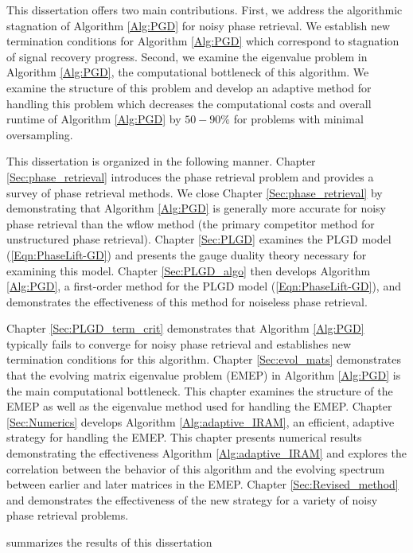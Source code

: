 This dissertation offers two main contributions.  First, we address the algorithmic stagnation of Algorithm \ref{Alg:PGD} for noisy phase retrieval.   We establish new termination conditions for Algorithm \ref{Alg:PGD} which correspond to stagnation of signal recovery progress.  Second, we examine the eigenvalue problem in Algorithm \ref{Alg:PGD}, the computational bottleneck of this algorithm.  We examine the structure of this problem and develop an adaptive method for handling this problem which decreases the computational costs and overall runtime of Algorithm \ref{Alg:PGD} by $50-90\%$ for problems with minimal oversampling.


This dissertation is organized in the following manner.  Chapter \ref{Sec:phase_retrieval} introduces the phase retrieval problem and provides a survey of phase retrieval methods.  
We close Chapter \ref{Sec:phase_retrieval} by demonstrating that Algorithm \ref{Alg:PGD} is generally more accurate for noisy phase retrieval than the wflow method (the primary competitor method for unstructured phase retrieval).
Chapter \ref{Sec:PLGD} examines the PLGD model (\ref{Eqn:PhaseLift-GD}) and presents the gauge duality theory necessary for examining this model.  Chapter \ref{Sec:PLGD_algo} then develops Algorithm \ref{Alg:PGD}, a first-order method for the PLGD model (\ref{Eqn:PhaseLift-GD}), and demonstrates the effectiveness of this method for noiseless phase retrieval.

Chapter \ref{Sec:PLGD_term_crit} demonstrates that Algorithm \ref{Alg:PGD} typically fails to converge for noisy phase retrieval and establishes new termination conditions for this algorithm.  
Chapter \ref{Sec:evol_mats}  demonstrates that the evolving matrix eigenvalue problem (EMEP) in Algorithm \ref{Alg:PGD} is the main computational bottleneck.  
This chapter examines the structure of the EMEP as well as the eigenvalue method used for handling the EMEP.  
Chapter \ref{Sec:Numerics} develops Algorithm \ref{Alg:adaptive_IRAM}, an efficient, adaptive strategy for handling the EMEP.
This chapter presents numerical results demonstrating the effectiveness Algorithm \ref{Alg:adaptive_IRAM} and explores the correlation between the behavior of this algorithm and the evolving spectrum between earlier and later matrices in the EMEP.
Chapter \ref{Sec:Revised_method} and demonstrates the effectiveness of the new strategy for a variety of noisy phase retrieval problems.

summarizes the results of this dissertation



